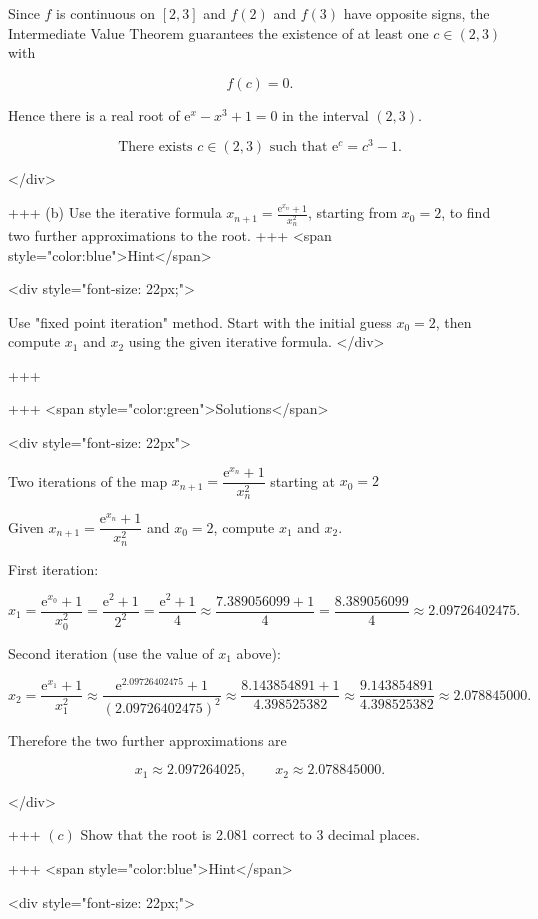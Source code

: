 Since $f$ is continuous on $[2,3]$ and $f(2)$ and $f(3)$ have opposite signs, the Intermediate Value Theorem guarantees the existence of at least one $c\in(2,3)$ with

$$
f(c)=0.
$$

Hence there is a real root of $\mathrm{e}^{x}-x^{3}+1=0$ in the interval $(2,3)$.


$$
\text{There exists }c\in(2,3)\text{ such that }\mathrm{e}^{c}=c^{3}-1.
$$

</div>

+++
(b) Use the iterative formula $x_{n+1}=\frac{\mathrm{e}^{x_{n}}+1}{x_{n}^{2}}$, starting from $x_{0}=2$, to find two further approximations to the root.
+++ <span style="color:blue">Hint</span>

<div style="font-size: 22px;">

Use "fixed point iteration" method. Start with the initial guess $x_0=2$, then compute $x_1$ and $x_2$ using the given iterative formula.
</div>

+++

+++ <span style="color:green">Solutions</span>

<div style="font-size: 22px">

Two iterations of the map $x_{n+1}=\dfrac{\mathrm{e}^{x_n}+1}{x_n^{2}}$ starting at $x_0=2$

Given $x_{n+1}=\dfrac{\mathrm{e}^{x_n}+1}{x_n^{2}}$ and $x_0=2$, compute $x_1$ and $x_2$.

First iteration:

$$
x_1=\frac{\mathrm{e}^{x_0}+1}{x_0^{2}}
=\frac{\mathrm{e}^{2}+1}{2^{2}}
=\frac{\mathrm{e}^{2}+1}{4}
\approx \frac{7.389056099+1}{4}
=\frac{8.389056099}{4}
\approx 2.09726402475.
$$


Second iteration (use the value of $x_1$ above):

$$
x_2=\frac{\mathrm{e}^{x_1}+1}{x_1^{2}}
\approx \frac{\mathrm{e}^{2.09726402475}+1}{(2.09726402475)^{2}}
\approx \frac{8.143854891+1}{4.398525382}
\approx \frac{9.143854891}{4.398525382}
\approx 2.078845000.
$$


Therefore the two further approximations are

$$
x_1\approx 2.097264025,\qquad x_2\approx 2.078845000.
$$

</div>

+++
\((c)\) Show that the root is 2.081 correct to 3 decimal places.

+++ <span style="color:blue">Hint</span>

<div style="font-size: 22px;">


